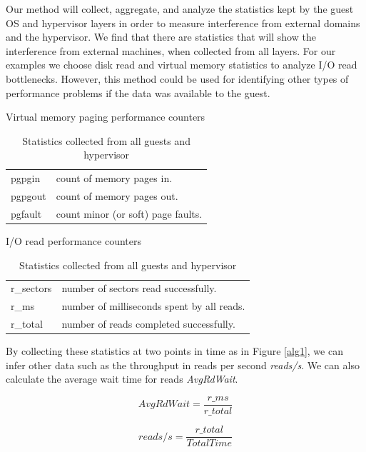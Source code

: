 Our method will collect, aggregate, and analyze the statistics kept by the guest OS and hypervisor layers in order to measure interference from external domains and the hypervisor.  We find that there are statistics that will show the interference from external machines, when collected from all layers.  For our examples we choose disk read and virtual memory statistics to analyze I/O read bottlenecks.  However, this method could be used for identifying other types of performance problems if the data was available to the guest.

\begin{table}[h]
\begin{subtable}[h]{0.40\textwidth}
\caption{Virtual memory paging performance counters \cite{memory}}
\begin{tabular}{ l p{4cm} }
       pgpgin  &  count of memory pages in. \\
       pgpgout  & count of memory pages out. \\
       pgfault  & count minor (or soft) page faults. \\
\end{tabular}
\label{fig:memory}
\end{subtable}
\hfill
\begin{subtable}[h]{0.40\textwidth}
\caption{I/O read performance counters \cite{iostats}}
\begin{tabular}{ l p{4cm} }
       r\_sectors & number of sectors read successfully. \\
       r\_ms & number of milliseconds spent by all reads. \\
       r\_total & number of reads completed successfully. \\
\end{tabular}
\label{fig:io}
\end{subtable}
\caption{Statistics collected from all guests and hypervisor}
\end{table}

By collecting these statistics at two points in time as in Figure \ref{alg1}, we can infer other data such as the throughput in reads per second \emph{reads/s}.  We can also calculate the average wait time for reads \emph{AvgRdWait}.  
\newline\newline

\begin{equation}
	AvgRdWait = \frac{r\_ms}{r\_total}
\end{equation}

\begin{equation}
	reads/s = \frac{r\_total}{TotalTime}
\end{equation}


